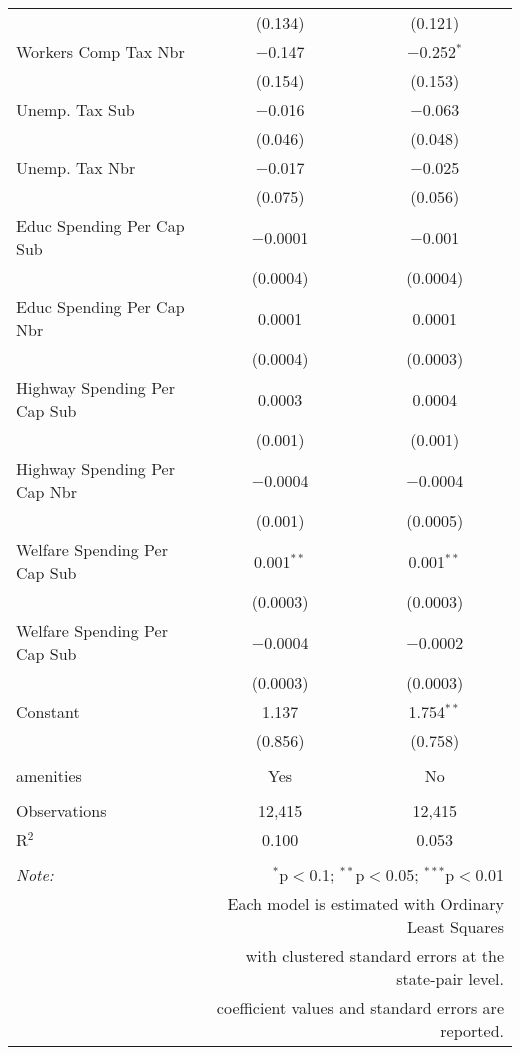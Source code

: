 \begin{table}[!htbp]
\begin{tabular}{@{\extracolsep{5pt}}lcc}
  & (0.134) & (0.121) \\ 
  Workers Comp Tax Nbr & $-$0.147 & $-$0.252$^{*}$ \\ 
  & (0.154) & (0.153) \\ 
  Unemp. Tax Sub & $-$0.016 & $-$0.063 \\ 
  & (0.046) & (0.048) \\ 
  Unemp. Tax Nbr & $-$0.017 & $-$0.025 \\ 
  & (0.075) & (0.056) \\ 
  Educ Spending Per Cap Sub & $-$0.0001 & $-$0.001 \\ 
  & (0.0004) & (0.0004) \\ 
  Educ Spending Per Cap Nbr & 0.0001 & 0.0001 \\ 
  & (0.0004) & (0.0003) \\ 
  Highway Spending Per Cap Sub & 0.0003 & 0.0004 \\ 
  & (0.001) & (0.001) \\ 
  Highway Spending Per Cap Nbr & $-$0.0004 & $-$0.0004 \\ 
  & (0.001) & (0.0005) \\ 
  Welfare Spending Per Cap Sub & 0.001$^{**}$ & 0.001$^{**}$ \\ 
  & (0.0003) & (0.0003) \\ 
  Welfare Spending Per Cap Sub & $-$0.0004 & $-$0.0002 \\ 
  & (0.0003) & (0.0003) \\ 
  Constant & 1.137 & 1.754$^{**}$ \\ 
  & (0.856) & (0.758) \\ 
 \hline \\[-1.8ex] 
amenities & Yes & No \\ 
\hline \\[-1.8ex] 
Observations & 12,415 & 12,415 \\ 
R$^{2}$ & 0.100 & 0.053 \\ 
\hline 
\hline \\[-1.8ex] 
\textit{Note:}  & \multicolumn{2}{r}{$^{*}$p$<$0.1; $^{**}$p$<$0.05; $^{***}$p$<$0.01} \\ 
 & \multicolumn{2}{r}{Each model is estimated with Ordinary Least Squares} \\ 
 & \multicolumn{2}{r}{with clustered standard errors at the state-pair level.} \\ 
 & \multicolumn{2}{r}{coefficient values and standard errors are reported.} \\ 
\end{tabular} 
\end{table} 
